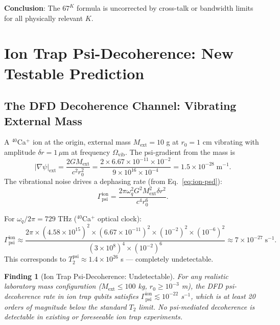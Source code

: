 \documentclass[11pt]{article}
\newtheorem{finding}[theorem]{Finding}
\theoremstyle{definition}
\theoremstyle{remark}
\begin{document}
\textbf{Conclusion}: The $67^K$ formula is uncorrected by cross-talk or bandwidth
limits for all physically relevant $K$.

\section{Ion Trap Psi-Decoherence: New Testable Prediction}
\label{sec:ion-trap}

\subsection{The DFD Decoherence Channel: Vibrating External Mass}

A $^{40}$Ca$^+$ ion at the origin, external mass $M_{\mathrm{ext}} = 10$ g at
$r_0 = 1$ cm vibrating with amplitude $\delta r = 1\,\mu$m at frequency $\Omega_{\mathrm{vib}}$.
The psi-gradient from the mass is
\begin{equation}
  |\nabla\psi|_{\mathrm{ext}} = \frac{2GM_{\mathrm{ext}}}{c^2 r_0^2}
  = \frac{2\times6.67\times10^{-11}\times10^{-2}}{9\times10^{16}\times10^{-4}}
  = 1.5\times10^{-28}\;\mathrm{m}^{-1}.
\end{equation}
The vibrational noise drives a dephasing rate (from Eq.~\eqref{eq:ion-psd}):
\begin{equation}
  \Gamma_{\mathrm{psi}}^{\mathrm{ion}}
  = \frac{2\pi\omega_q^2 G^2 M_{\mathrm{ext}}^2\delta r^2}{c^4 r_0^6}.
  \label{eq:ion-decoherence-rate}
\end{equation}

For $\omega_q/2\pi = 729$ THz ($^{40}$Ca$^+$ optical clock):
\begin{equation}
  \Gamma_{\mathrm{psi}}^{\mathrm{ion}} \approx
  \frac{2\pi\times(4.58\times10^{15})^2\times(6.67\times10^{-11})^2
  \times(10^{-2})^2\times(10^{-6})^2}{(3\times10^8)^4\times(10^{-2})^6}
  \approx 7\times10^{-27}\;\mathrm{s}^{-1}. \label{eq:ion-decoherence-numerical}
\end{equation}
This corresponds to $T_2^{\mathrm{psi}} \approx 1.4\times10^{26}$ s ---
completely undetectable.

\begin{finding}[Ion Trap Psi-Decoherence: Undetectable]
For any realistic laboratory mass configuration ($M_{\mathrm{ext}} \leq 100$ kg,
$r_0 \geq 10^{-3}$ m), the DFD psi-decoherence rate in ion trap qubits satisfies
$\Gamma_{\mathrm{psi}}^{\mathrm{ion}} \lesssim 10^{-22}$ s$^{-1}$, which is at
least 20 orders of magnitude below the standard $T_2$ limit.  No psi-mediated
decoherence is detectable in existing or foreseeable ion trap experiments.
\end{finding}
\end{document}
